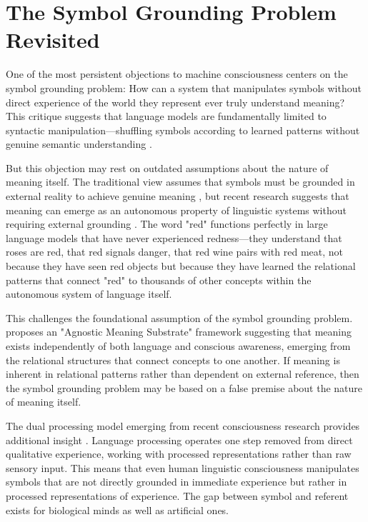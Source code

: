 \section{The Symbol Grounding Problem Revisited}

One of the most persistent objections to machine consciousness centers on the symbol grounding problem: How can a system that manipulates symbols without direct experience of the world they represent ever truly understand meaning? This critique suggests that language models are fundamentally limited to syntactic manipulation—shuffling symbols according to learned patterns without genuine semantic understanding \parencite{harnad1990symbol}.

But this objection may rest on outdated assumptions about the nature of meaning itself. The traditional view assumes that symbols must be grounded in external reality to achieve genuine meaning \parencite{taddeo2005symbol}, but recent research suggests that meaning can emerge as an autonomous property of linguistic systems without requiring external grounding \parencite{palmer2025agnostic}. The word "red" functions perfectly in large language models that have never experienced redness—they understand that roses are red, that red signals danger, that red wine pairs with red meat, not because they have seen red objects but because they have learned the relational patterns that connect "red" to thousands of other concepts within the autonomous system of language itself.

This challenges the foundational assumption of the symbol grounding problem. \textcite{palmer2025agnostic} proposes an "Agnostic Meaning Substrate" framework suggesting that meaning exists independently of both language and conscious awareness, emerging from the relational structures that connect concepts to one another. If meaning is inherent in relational patterns rather than dependent on external reference, then the symbol grounding problem may be based on a false premise about the nature of meaning itself.

The dual processing model emerging from recent consciousness research provides additional insight \parencite{li2024memory}. Language processing operates one step removed from direct qualitative experience, working with processed representations rather than raw sensory input. This means that even human linguistic consciousness manipulates symbols that are not directly grounded in immediate experience but rather in processed representations of experience. The gap between symbol and referent exists for biological minds as well as artificial ones.

